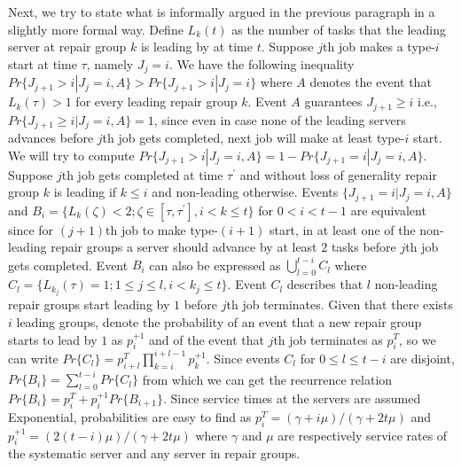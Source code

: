 \documentclass[sigconf,draft]{acmart}
\begin{document}
Next, we try to state what is informally argued in the previous paragraph in a slightly more formal way. Define $L_k(t)$ as the number of tasks that the leading server at repair group $k$ is leading by at time $t$. Suppose $j$th job makes a type-$i$ start at time $\tau$, namely $J_j = i$. We have the following inequality $Pr\{J_{j+1} > i|J_j=i, A\} > Pr\{J_{j+1} > i|J_j=i\}$ where $A$ denotes the event that $L_k(\tau) > 1$ for every leading repair group $k$. Event $A$ guarantees $J_{j+1} \geq i$ i.e., $Pr\{J_{j+1} \geq i|J_j=i, A\}=1$, since even in case none of the leading servers advances before $j$th job gets completed, next job will make at least type-$i$ start. We will try to compute $Pr\{J_{j+1} > i|J_j=i, A\} = 1 - Pr\{J_{j+1}=i|J_j=i, A\}$. Suppose $j$th job gets completed at time $\tau^\prime$ and without loss of generality repair group $k$ is leading if $k \leq i$ and non-leading otherwise. Events $\{J_{j+1}=i|J_j=i, A\}$ and $B_i = \{L_k(\zeta) < 2; \zeta \in [\tau, \tau^\prime], i < k \leq t\}$ for $0 < i < t-1$ are equivalent since for $(j+1)$th job to make type-$(i+1)$ start, in at least one of the non-leading repair groups a server should advance by at least $2$ tasks before $j$th job gets completed. Event $B_i$ can also be expressed as $\bigcup\limits_{l=0}^{t-i} C_l$ where $C_l = \{L_{k_j}(\tau)=1; 1 \leq j \leq l, i < k_j \leq t\}$. Event $C_l$ describes that $l$ non-leading repair groups start leading by $1$ before $j$th job terminates. Given that there exists $i$ leading groups, denote the probability of an event that a new repair group starts to lead by $1$ as $p_i^{+1}$ and of the event that $j$th job terminates as $p_i^T$, so we can write $Pr\{C_l\} = p_{i+l}^T\prod\limits_{k=i}^{i+l-1}p_k^{+1}$. Since events $C_l$ for $0 \leq l \leq t-i$ are disjoint, $Pr\{B_i\} = \sum\limits_{l=0}^{t-i} Pr\{C_l\}$ from which we can get the recurrence relation $Pr\{B_i\} = p_i^T + p_i^{+1}Pr\{B_{i+1}\}$. Since service times at the servers are assumed Exponential, probabilities are easy to find as $p_i^T = (\gamma+i\mu)/(\gamma+2t\mu)$ and $p_i^{+1} = (2(t-i)\mu)/(\gamma+2t\mu)$ where $\gamma$ and $\mu$ are respectively service rates of the systematic server and any server in repair groups.
\end{document}
